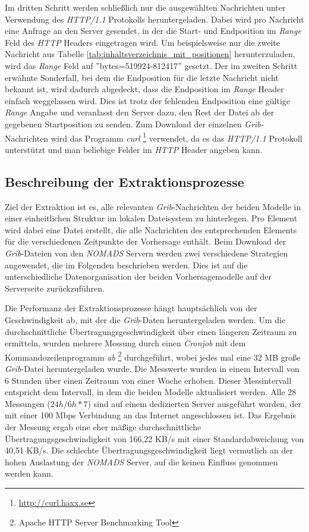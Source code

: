 Im dritten Schritt werden schließlich nur die ausgewählten Nachrichten
unter Verwendung des \textit{HTTP/1.1} Protokolls
heruntergeladen. Dabei wird pro Nachricht eine Anfrage an den Server
gesendet, in der die Start- und Endposition im \textit{Range} Feld des
\textit{HTTP} Headers eingetragen wird. Um beispielsweise nur die
zweite Nachricht aus Tabelle
\ref{tab:inhaltsverzeichnis_mit_positionen} herunterzuladen, wird das
\textit{Range} Feld auf ''bytes=519924-812417'' gesetzt. Der im
zweiten Schritt erwähnte Sonderfall, bei dem die Endposition für die
letzte Nachricht nicht bekannt ist, wird dadurch abgedeckt, dass die
Endposition im \textit{Range} Header einfach weggelassen wird. Dies
ist trotz der fehlenden Endposition eine gültige \textit{Range} Angabe
und veranlasst den Server dazu, den Rest der Datei ab der gegebenen
Startposition zu senden. Zum Download der einzelnen
\textit{Grib-}Nachrichten wird das Programm \textit{curl}
\footnote{\url{http://curl.haxx.se}} verwendet, da es das
\textit{HTTP/1.1} Protokoll unterstützt und man beliebige Felder im
\textit{HTTP} Header angeben kann.

\subsection{Beschreibung der Extraktionsprozesse}
Ziel der Extraktion ist es, alle relevanten \textit{Grib}-Nachrichten
der beiden Modelle in einer einheitlichen Struktur im lokalen
Dateisystem zu hinterlegen. Pro Element wird dabei eine Datei
erstellt, die alle Nachrichten des entsprechenden Elements für die
verschiedenen Zeitpunkte der Vorhersage enthält. Beim Download der
\textit{Grib}-Dateien von den \textit{NOMADS} Servern werden zwei
verschiedene Strategien angewendet, die im Folgenden beschrieben
werden. Dies ist auf die unterschiedliche Datenorganisation der beiden
Vorhersagemodelle auf der Serverseite zurückzuführen.

Die Performanz der Extraktionsprozesse hängt hauptsächlich von der
Geschwindigkeit ab, mit der die \textit{Grib}-Daten heruntergeladen
werden. Um die durchschnittliche Übertragungsgeschwindigkeit über
einen längeren Zeitraum zu ermitteln, wurden mehrere Messung durch
einen \textit{Cronjob} mit dem Kommandozeilenprogramm \textit{ab}
\footnote{Apache HTTP Server Benchmarking Tool} durchgeführt, wobei
jedes mal eine 32 MB große \textit{Grib}-Datei heruntergeladen
wurde. Die Messwerte wurden in einem Intervall von 6 Stunden über
einen Zeitraum von einer Woche erhoben. Dieser Messintervall
entspricht dem Intervall, in dem die beiden Modelle aktualisiert
werden. Alle 28 Messungen ($24h/6h * 7$) sind auf einem dedizierten
Server ausgeführt worden, der mit einer 100 Mbps Verbindung an das
Internet angeschlossen ist. Das Ergebnis der Messung ergab eine eher
mäßige durchschnittliche Übertragungsgeschwindigkeit von 166,22 KB/s
mit einer Standardabweichung von 40,51 KB/s. Die schlechte
Übertragungsgeschwindigkeit liegt vermutlich an der hohen Auslastung
der \textit{NOMADS} Server, auf die keinen Einfluss genommen werden
kann.

